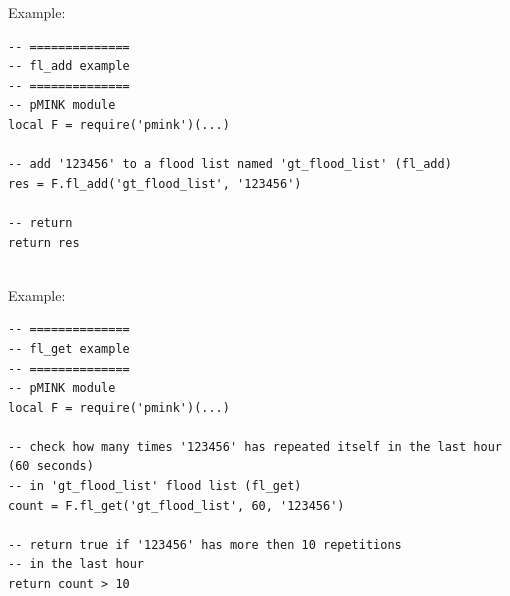 \documentclass[a4paper,latin]{paper}
\begin{document}
\noindent{}Example:
\begin{lstlisting}[style=LuaInputStyle, belowskip=4\baselineskip, upquote=true]
-- ==============
-- fl_add example 
-- ==============
-- pMINK module
local F = require('pmink')(...)

-- add '123456' to a flood list named 'gt_flood_list' (fl_add)
res = F.fl_add('gt_flood_list', '123456')

-- return
return res
\end{lstlisting}
\clearpage

\\

\noindent{}Example:
\begin{lstlisting}[style=LuaInputStyle, belowskip=4\baselineskip, upquote=true]
-- ==============
-- fl_get example 
-- ==============
-- pMINK module
local F = require('pmink')(...)

-- check how many times '123456' has repeated itself in the last hour (60 seconds) 
-- in 'gt_flood_list' flood list (fl_get)
count = F.fl_get('gt_flood_list', 60, '123456')

-- return true if '123456' has more then 10 repetitions 
-- in the last hour
return count > 10
\end{lstlisting}
\end{document}
